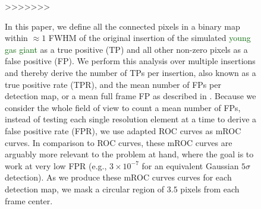 \documentclass{aa}
\newcommand{\newchange}[1]{\textcolor{darkgreen}{#1}}
\begin{document}
{{{\begin{figure}[t]
>>>>>>>

In this paper, we define all the connected pixels in a binary map within $\approx 1$ FWHM of the original insertion of the simulated \newchange{young gas giant} as a true positive (TP) and all other non-zero pixels as a false positive (FP). We perform this analysis over multiple insertions and thereby derive the number of TPs per insertion, also known as a true positive rate (TPR), and the mean number of FPs per detection map, or a mean full frame FP as described in \citet{2018Gomez}. Because we consider the whole field of view to count a mean number of FPs, instead of testing each single resolution element at a time to derive a false positive rate (FPR), we use adapted ROC curves as mROC curves. In comparison to ROC curves, these mROC curves are arguably more relevant to the problem at hand, where the goal is to work at very low FPR (e.g., $3\times 10^{-7}$ for an equivalent Gaussian $5\sigma$ detection). As we produce these mROC curves  curves for each detection map, we mask a circular region of $3.5$ pixels from each frame center.


\end{figure}}}}
\end{document}
